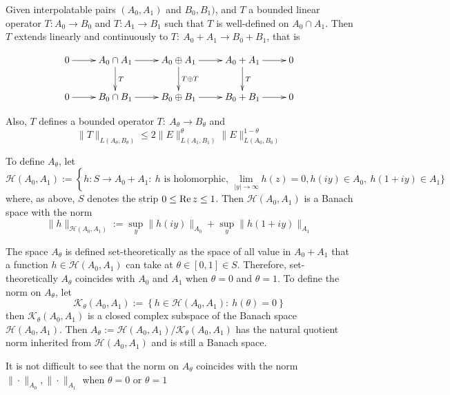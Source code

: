 \begin{theorem}
\label{thm:interp-ineq-op}
Given interpolatable pairs \((A_0,A_1)\) and \(B_0, B_1)\), and \(T\) a
bounded linear operator \(T: A_0 \longrightarrow B_0\) and
\(T: A_1 \longrightarrow B_1\) such that \(T\) is well-defined on \(A_0\cap A_1\). Then \(T\) extends linearly and continuously to \(T:\ A_0+A_1 \longrightarrow B_0+
B_1\), that is

\begin{equation}
\xymatrix{
0 \ar@{->}[r] & A_0\cap A_1 \ar@{->}[r] \ar@{->}[d]^{T} & A_0\oplus A_1 \ar@{->}[r] \ar@{->}[d]^{T\oplus T} & A_0+A_1 \ar@{->}[r] \ar@{->}[d]^{T} & 0 \\
0 \ar@{->}[r] & B_0\cap B_1 \ar@{->}[r] & B_0\oplus B_1 \ar@{->}[r] & B_0+B_1 \ar@{->}[r] & 0
}
\end{equation}

Also, \(T\) defines a bounded operator \(T:\ A_\theta \longrightarrow  B_\theta\) and
\[
 \|T\|_{L(A_\theta,B_\theta)}\leq 2 \|E\|_{L(A_1,B_1)}^\theta \|E\|_{L(A_0,B_0)}^{1-\theta}
\]
\end{theorem}

To define \(A_\theta\), let 
\[
 \mathcal{H}(A_0,A_1):= \left\{ h: S \longrightarrow A_0+ A_1 :\ h \text{ is holomorphic, } \lim_{|y|\to\infty}h(z) = 0, h(iy)\in A_0,\ h(1+iy)\in A_1 \}
\]
where, as above, \(S\) denotes the strip \(0\leq \mathop{\rm Re}\nolimits z\leq 1\). Then \(\mathcal{H}(A_0, A_1)\) is a Banach space with the norm
\[
 \|h\|_{\mathcal{H}(A_0, A_1)}:= \sup_y \|h(iy)\|_{A_0} + \sup_y \| h(1+iy)\|_{A_1}
\]

The space \(A_\theta\) is defined set-theoretically as the space of all value in \(A_0+
A_1\) that a function \(h\in \mathcal{H}(A_0, A_1)\) can take at \(\theta\in [0,1]\in S\). Therefore, set-theoretically \(A_\theta\) coincides with \(A_0\) and \(A_1\)
when \(\theta=0\) and \(\theta=1\). To define the norm on \(A_\theta\), let
\[
 \mathcal{K}_\theta(A_0, A_1):= \left\{h\in \mathcal{H}(A_0, A_1):\ h(\theta)=0 \right\}
\]
then \(\mathcal{K}_\theta(A_0,A_1)\) is a closed complex subspace of the Banach space \(\mathcal{H}(A_0, A_1)\). Then \(A_\theta:= \mathcal{H}(A_0, A_1)/
\mathcal{K}_\theta(A_0, A_1)\) has the natural quotient norm inherited from \(\mathcal{H}(A_0, A_1)\) and is still a Banach space.

It is not difficult to see that the norm on \(A_\theta\) coincides with the norm \(\|\cdot\|_{A_0} , \|\cdot\|_{A_1}\) when \(\theta=0\) or \(\theta=1\)

